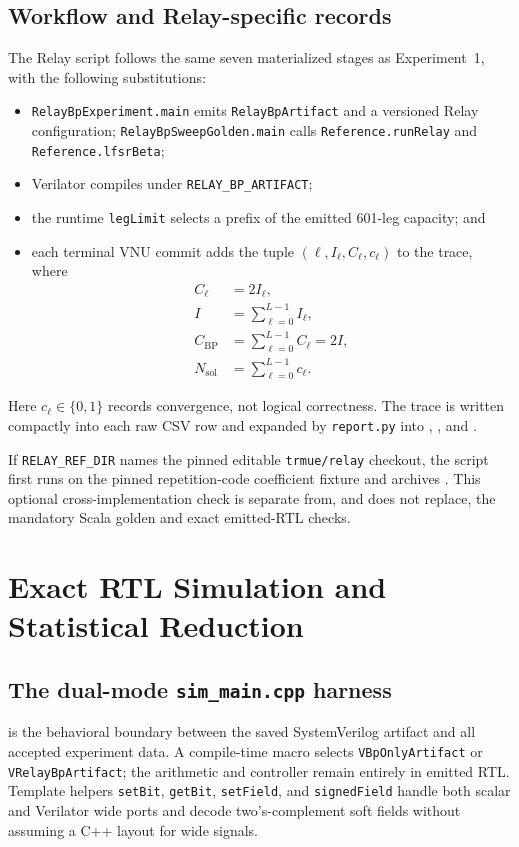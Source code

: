 \documentclass[10pt,conference]{IEEEtran}
\begin{document}
\subsection{Workflow and Relay-specific records}
The Relay script follows the same seven materialized stages as Experiment~1,
with the following substitutions:
\begin{itemize}
  \item \texttt{RelayBpExperiment.main} emits \texttt{RelayBpArtifact} and a
        versioned Relay configuration; \texttt{RelayBpSweepGolden.main} calls
        \texttt{Reference.runRelay} and \texttt{Reference.lfsrBeta};
  \item Verilator compiles  under
        \texttt{RELAY\_BP\_ARTIFACT};
  \item the runtime \texttt{legLimit} selects a prefix of the emitted 601-leg
        capacity; and
  \item each terminal VNU commit adds the tuple
        $(\ell,I_\ell,C_\ell,c_\ell)$ to the trace, where
\begin{align}
 C_\ell&=2I_\ell,\\
 I&=\sum_{\ell=0}^{L-1}I_\ell,\\
 C_{\mathrm{BP}}&=\sum_{\ell=0}^{L-1}C_\ell=2I,\\
 N_{\mathrm{sol}}&=\sum_{\ell=0}^{L-1}c_\ell.
 \label{eq:relay-trace-invariants}
\end{align}
\end{itemize}
Here $c_\ell\in\{0,1\}$ records convergence, not logical correctness.  The
trace is written compactly into each raw CSV row and expanded by
\texttt{report.py} into ,
, and .

If \texttt{RELAY\_REF\_DIR} names the pinned editable \texttt{trmue/relay}
checkout, the script first runs  on the
pinned repetition-code coefficient fixture and archives
.  This optional cross-implementation
check is separate from, and does not replace, the mandatory Scala golden and
exact emitted-RTL checks.

\section{Exact RTL Simulation and Statistical Reduction}
\subsection{The dual-mode \texttt{sim\_main.cpp} harness}
 is the behavioral boundary between the
saved SystemVerilog artifact and all accepted experiment data.  A compile-time
macro selects \texttt{VBpOnlyArtifact} or \texttt{VRelayBpArtifact}; the
arithmetic and controller remain entirely in emitted RTL.  Template helpers
\texttt{setBit}, \texttt{getBit}, \texttt{setField}, and
\texttt{signedField} handle both scalar and Verilator wide ports and decode
two's-complement soft fields without assuming a C++ layout for wide signals.
\end{document}
